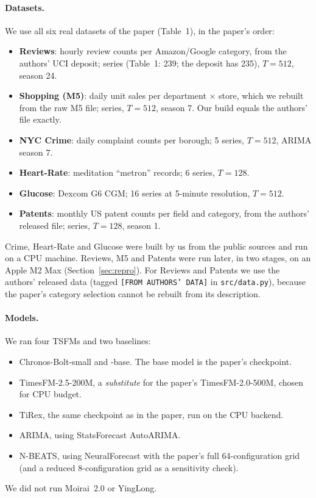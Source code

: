\paragraph{Datasets.} We use all six real datasets of the paper (Table~1), in the paper's order:
\begin{itemize}
\item \textbf{Reviews}: hourly review counts per Amazon/Google category, from the authors' UCI
deposit\supercite{reviewsuci}; \nserRev{} series (Table~1: 239; the deposit has 235), $T{=}512$, season 24.
\item \textbf{Shopping (M5)}: daily unit sales per department $\times$ store, which we rebuilt from the raw M5
file\supercite{makridakis2022m5}; \nserMfive{} series, $T{=}512$, season 7. Our build equals the authors' file exactly.
\item \textbf{NYC Crime}: daily complaint counts per borough\supercite{nypd}; 5 series, $T{=}512$, ARIMA season 7.
\item \textbf{Heart-Rate}: meditation ``metron'' records\supercite{meditation}; 6 series, $T{=}128$.
\item \textbf{Glucose}: Dexcom G6 CGM\supercite{bigideas}; 16 series at 5-minute resolution, $T{=}512$.
\item \textbf{Patents}: monthly US patent counts per field and category\supercite{marco2015patents}, from the
authors' released file\supercite{authorsrepo}; \nserPat{} series, $T{=}128$, season 1.
\end{itemize}
Crime, Heart-Rate and Glucose were built by us from the public sources and run on a CPU machine. Reviews, M5 and
Patents were run later, in two stages, on an Apple M2 Max (Section~\ref{sec:repro}). For Reviews and Patents we use
the authors' released data (tagged \texttt{[FROM AUTHORS' DATA]} in \texttt{src/data.py}), because the paper's
category selection cannot be rebuilt from its description.

\paragraph{Models.} We ran four TSFMs and two baselines:
\begin{itemize}
\item Chronos-Bolt-small and -base\supercite{ansari2024chronos}. The base model is the paper's checkpoint.
\item TimesFM-2.5-200M\supercite{das2024timesfm}, a \emph{substitute} for the paper's TimesFM-2.0-500M, chosen for CPU budget.
\item TiRex\supercite{auer2025tirex}, the same checkpoint as in the paper, run on the CPU backend.
\item ARIMA, using StatsForecast AutoARIMA\supercite{statsforecast,hyndman2008autoarima}.
\item N-BEATS, using NeuralForecast\supercite{neuralforecast} with the paper's full 64-configuration grid (and a reduced 8-configuration grid as a sensitivity check).
\end{itemize}
We did not run Moirai~2.0 or YingLong.

